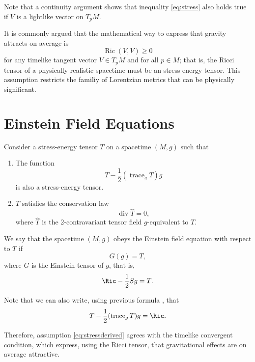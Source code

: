 Note that a continuity argument shows that inequality \ref{eq:stress} also holds true if $V$ is a lightlike vector on $T_p M$.

It is commonly argued that the mathematical way to express that gravity attracts on average is
\begin{equation}
	\operatorname{Ric} (V,V) \geq 0
\end{equation}
for any timelike tangent vector $V \in T_p M$ and for all $p \in M$; that is, the Ricci tensor of a physically realistic spacetime must be an stress-energy tensor. This assumption restricts the familiy of Lorentzian metrics that can be physically significant.

\section{Einstein Field Equations}

Consider a stress-energy tensor $T$ on a spacetime $(M,g)$ such that
\begin{enumerate}
	\item The function \begin{equation}
		\label{eq:stressderived}
		T - \frac{1}{2}(\operatorname{trace}_g T) g
	\end{equation} is also a stress-energy tensor.
	\item $T$ satisfies the conservation law \begin{equation}
		\label{eq:div0}
		\operatorname{div} \widehat{T} = 0,
	\end{equation}
	where $\widehat{T}$ is the 2-contravariant tensor field $g$-equivalent to $T$.
\end{enumerate}

We say that the spacetime $(M,g)$ obeys the Einstein field equation with respect to $T$ if
\begin{equation}
	\label{eq:einstein}
	G(g) = T,
\end{equation}
where $G$ is the Einstein tensor of $g$, that is,
\begin{equation}
	\label{eq:einstein2}
	\Ric - \frac{1}{2}Sg = T.
\end{equation}

Note that we can also write, using previous formula , that
\begin{equation}
	\label{eq:einstein3}
	T - \frac{1}{2}(\operatorname{trace}_g T)g = \Ric.
\end{equation}

Therefore, assumption \ref{eq:stressderived} agrees with the timelike convergent condition, which express, using the Ricci tensor, that gravitational effects are on average attractive.

